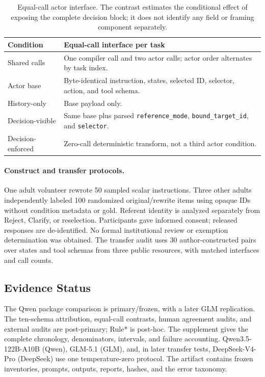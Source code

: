 \documentclass[letterpaper]{article}
\begin{document}
\begin{table}[t]
\centering
\footnotesize
\setlength{\tabcolsep}{3pt}
\begin{tabular}{@{}p{}p{}@{}}
\toprule
Condition & Equal-call interface per task \\
\midrule
Shared calls & One compiler call and two actor calls; actor order alternates by task index. \\
Actor base & Byte-identical instruction, states, selected ID, selector, action, and tool schema. \\
History-only & Base payload only. \\
Decision-visible & Same base plus parsed \texttt{reference\_mode}, \texttt{bound\_target\_id}, and \texttt{selector}. \\
Decision-enforced & Zero-call deterministic transform, not a third actor condition. \\
\bottomrule
\end{tabular}
\caption{Equal-call actor interface. The contrast estimates the conditional effect of exposing the
complete decision block; it does not identify any field or framing component separately.}
\label{tab:equal-call-interface}
\end{table}

\paragraph{Construct and transfer protocols.}
One adult volunteer rewrote 50 sampled scalar instructions. Three other adults independently
labeled 100 randomized original/rewrite items using opaque IDs without condition metadata or gold.
Referent identity is analyzed separately from Reject, Clarify, or reselection. Participants gave
informed consent; released responses are de-identified. No formal institutional review or exemption
determination was obtained. The transfer audit uses 30 author-constructed pairs over states and tool
schemas from three public resources, with matched interfaces and call counts.

\subsection{Evidence Status}
The Qwen package comparison is primary/frozen, with a later GLM replication. The ten-schema
attribution, equal-call contrasts, human agreement audits, and external audits are post-primary;
Rule* is post-hoc. The supplement gives the complete chronology, denominators, intervals, and
failure accounting. Qwen3.5-122B-A10B (Qwen), GLM-5.1 (GLM), and, in later transfer tests,
DeepSeek-V4-Pro (DeepSeek) use one temperature-zero protocol. The artifact contains frozen
inventories, prompts, outputs, reports, hashes, and the error taxonomy.
\end{document}
